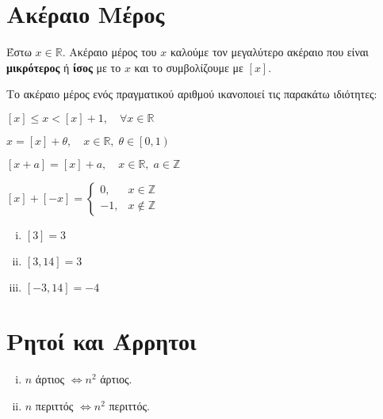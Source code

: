 \section{Ακέραιο Μέρος}

\begin{mybox1}
  \begin{dfn}
    Έστω $ x \in \mathbb{R} $. Ακέραιο μέρος του $ x $ καλούμε τον 
    μεγαλύτερο ακέραιο που είναι \textbf{μικρότερος} ή \textbf{ίσος} 
    με το $x$ και το συμβολίζουμε με $ [x] $.
  \end{dfn}
\end{mybox1}

Το ακέραιο μέρος ενός πραγματικού αριθμού ικανοποιεί τις παρακάτω ιδιότητες:

\begin{myitemize}
  \item $ [x] \leq x < [x]+1, \quad \forall x \in \mathbb{R} $
  \item $ x = [x]+ \theta, \quad x \in \mathbb{R}, \; \theta \in \left[0,1\right) $
  \item $ [x+a]= [x] + a, \quad x \in \mathbb{R}, \; a \in \mathbb{Z} $
  \item $ [x]+[-x] = 
    \begin{cases} 
      0, & x \in \mathbb{Z} \\
      -1, & x \not \in \mathbb{Z}
    \end{cases}$
\end{myitemize}

\begin{example}
\item {}
  \begin{enumerate}[(i)]
    \item $ [3]=3 $
    \item $ [3,14] = 3  $
    \item $ [-3,14] =-4 $
  \end{enumerate}
\end{example}


\section{Ρητοί και Άρρητοι}

\begin{lem}
\item {}
  \begin{enumerate}[(i)]
    \item $n$ άρτιος $ \Leftrightarrow n^{2} $ άρτιος.
    \item $ n $ περιττός $ \Leftrightarrow n^{2} $ περιττός.
  \end{enumerate}
\end{lem}

